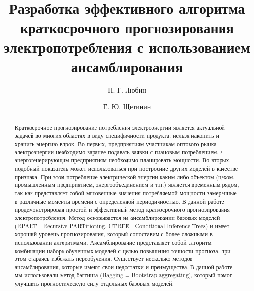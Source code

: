 \documentclass[60x84/16,8pt]{ittmm}
\begin{document}

\title{Разработка эффективного алгоритма краткосрочного прогнозирования электропотребления с использованием ансамблирования}

\author[1]{П. Г. Любин}
\author[1]{Е. Ю. Щетинин}

\address[1]{Кафедра прикладной информатики и теории вероятностей,\\
  Российский университет дружбы народов,\\
  ул. Миклухо-Маклая, д.6, Москва, Россия, 117198}


\begin{abstract}
Краткосрочное прогнозирование потребления электроэнергии является актуальной задачей во многих областях в виду специфичности продукта: нельзя накопить и хранить энергию впрок. Во-первых, предприятиям-участникам оптового рынка электроэнергии необходимо заранее подавать заявки с плановым потреблением, а энергогенерирующим предприятиям необходимо планировать мощности. Во-вторых, подобный показатель может использоваться при построение других моделей в качестве признака. При этом потребление электрической энергии каким-либо объектом (цехом, промышленным предприятием, энергообъединением и т.п.) является временным рядом, так как представляет собой мгновенные значения потребляемой мощности замеренные в различные моменты времени с определенной периодичностью. В данной работе продемонстрирован простой и эффективный метод краткосрочного прогнозирования электропотребления. Метод основывается на ансамблировании базовых моделей (RPART - Recursive PARTitioning, CTREE - Conditional Inference Trees) и имеет хороший уровень прогнозирования, который сопоставим с более сложными в использовании алгоритмами. Ансамблирование представляет собой алгоритм комбинации набора обученных моделей с целью повышения точности прогноза, при этом стараясь избежать переобучения. Существует несколько методов ансамблирования, которые имеют свои недостатки и преимущества. В данной работе мы использовали метод бэггинга (Bagging = Bootstrap aggregating), который помог улучшить прогностическую силу отдельных базовых моделей.
\end{abstract}


\end{document}
